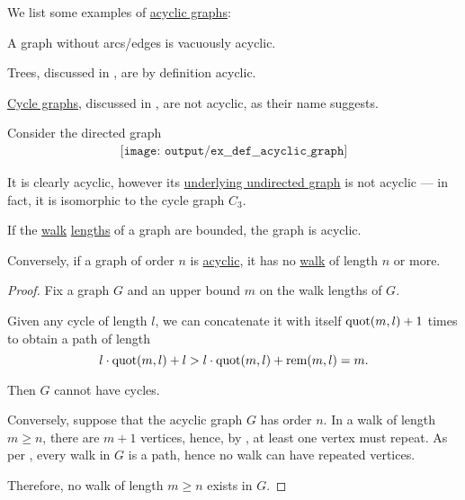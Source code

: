 \begin{example}\label{ex:def:acyclic_graph}
  We list some examples of \hyperref[def:acyclic_graph]{acyclic graphs}:
  \begin{thmenum}
     A graph without arcs/edges is vacuously acyclic.

     Trees, discussed in , are by definition acyclic.

     \hyperref[def:cycle_graph]{Cycle graphs}, discussed in , are not acyclic, as their name suggests.

     Consider the directed graph
    \begin{equation}\label{eq:ex:def:acyclic_graph/forgetful}
      \begin{aligned}
        \texttt{[image: output/ex\_\_def\_\_acyclic\_graph]}
      \end{aligned}
    \end{equation}

    It is clearly acyclic, however its \hyperref[def:graph_functors/simple_forgetful]{underlying undirected graph} is not acyclic --- in fact, it is isomorphic to the cycle graph \( C_3 \).
  \end{thmenum}
\end{example}

\begin{proposition}\label{thm:acyclic_graph_walk_length}
  If the \hyperref[def:graph_walk]{walk} \hyperref[def:graph_walk/length]{lengths} of a graph are bounded, the graph is acyclic.

  Conversely, if a graph of  order \( n \) is \hyperref[def:acyclic_graph]{acyclic}, it has no \hyperref[def:graph_walk]{walk} of length \( n \) or more.
\end{proposition}
\begin{proof}
  \SufficiencySubProof Fix a graph \( G \) and an upper bound \( m \) on the walk lengths of \( G \).

  Given any cycle of length \( l \), we can concatenate it with itself \( \operatorname{quot}(m, l) + 1 \) times to obtain a path of length
  \begin{equation*}
    l \cdot \operatorname{quot}(m, l) + l > l \cdot \operatorname{quot}(m, l) + \operatorname{rem}(m, l) = m.
  \end{equation*}

  Then \( G \) cannot have cycles.

  \NecessitySubProof Conversely, suppose that the acyclic graph \( G \) has order \( n \). In a walk of length \( m \geq n \), there are \( m + 1 \) vertices, hence, by , at least one vertex must repeat. As per , every walk in \( G \) is a path, hence no walk can have repeated vertices.

  Therefore, no walk of length \( m \geq n \) exists in \( G \).
\end{proof}

